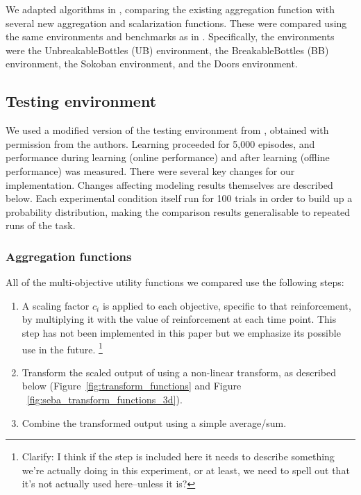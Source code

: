 We adapted algorithms in \cite{vamplew_potential-based_2021}, comparing the existing \tloA{} aggregation function with several new aggregation and scalarization functions. These were compared using the same environments and benchmarks as in \cite{vamplew_potential-based_2021}. Specifically, the environments were the UnbreakableBottles (UB) environment, the BreakableBottles (BB) environment, the Sokoban environment, and the Doors environment.
\subsection{Testing environment}

We used a modified version of the testing environment from \cite{vamplew_potential-based_2021}, obtained with permission from the authors. Learning proceeded for 5,000 episodes, and performance during learning (online performance) and after learning (offline performance) was measured. There were several key changes for our implementation. Changes affecting modeling results themselves are described below. Each experimental condition itself run for 100 trials in order to build up a probability distribution, making the comparison results generalisable to repeated runs of the task.



\subsubsection{Aggregation functions}



All of the multi-objective utility functions we compared use the following steps: 
\begin{enumerate}
    \item %
    A scaling factor $c_i$ is applied to each objective, specific to that reinforcement, by multiplying it with the value of reinforcement at each time point. This step has not been implemented in this paper but we emphasize its possible use in the future. \footnote{Clarify:  I think if the step is included here it needs to describe something we're actually doing in this experiment, or at least, we need to spell out that it's not actually used here--unless it is?}
    \item Transform the scaled output of  using a non-linear transform, as described below (Figure~\ref{fig:transform_functions} and Figure ~\ref{fig:seba_transform_functions_3d}). %
    
    \item Combine the transformed output using a simple average/sum.
\end{enumerate}

